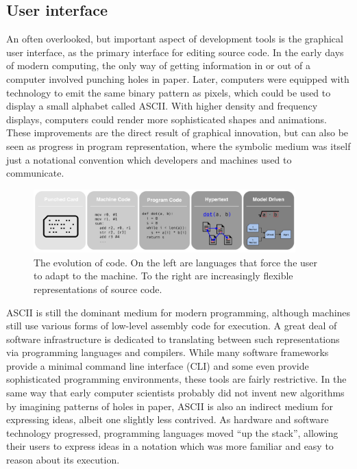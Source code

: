 \documentclass[12pt,initial,twoside,maitrise]{dms}
\numberwithin{equation}{section}
\numberwithin{table}{chapter}
\numberwithin{figure}{chapter}
\begin{document}
\subsection{User interface}

An often overlooked, but important aspect of development tools is the graphical user interface, as the primary interface for editing source code. In the early days of modern computing, the only way of getting information in or out of a computer involved punching holes in paper. Later, computers were equipped with technology to emit the same binary pattern as pixels, which could be used to display a small alphabet called ASCII. With higher density and frequency displays, computers could render more sophisticated shapes and animations. These improvements are the direct result of graphical innovation, but can also be seen as progress in program representation, where the symbolic medium was itself just a notational convention which developers and machines used to communicate.

\begin{figure}
    \centering
    \includegraphics[width=0.90\textwidth]{../figures/progress_in_program.png}
    \caption{The evolution of code. On the left are languages that force the user to adapt to the machine. To the right are increasingly flexible representations of source code.}
    \label{fig:evolution_of_programming}
\end{figure}

ASCII is still the dominant medium for modern programming, although machines still use various forms of low-level assembly code for execution. A great deal of software infrastructure is dedicated to translating between such representations via programming languages and compilers. While many software frameworks provide a minimal command line interface (CLI) and some even provide sophisticated programming environments, these tools are fairly restrictive. In the same way that early computer scientists probably did not invent new algorithms by imagining patterns of holes in paper, ASCII is also an indirect medium for expressing ideas, albeit one slightly less contrived. As hardware and software technology progressed, programming languages moved ``up the stack'', allowing their users to express ideas in a notation which was more familiar and easy to reason about its execution.
\end{document}
